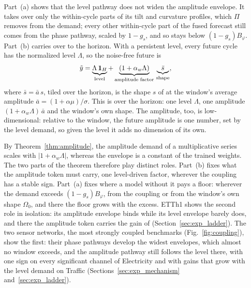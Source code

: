 {Part~(a) shows that the level pathway does not widen the amplitude envelope. It takes over only the within-cycle parts of its tilt and curvature profiles, which $\Pi$ removes from the demand; every other within-cycle part of the fused forecast still comes from the phase pathway, scaled by $1-g_s$, and so stays below $(1-g_s)B_\varphi$. Part~(b) carries  over to the horizon. With a persistent level, every future cycle has the normalized level $\Lambda$, so the noise-free future is
\begin{equation}
\tilde y=\underbrace{\Lambda\,\mathbf 1_H}_{\text{level}}+\underbrace{(1+\alpha_w\Lambda)}_{\text{amplitude factor}}\,\underbrace{\bar s}_{\text{shape}} ,
\label{eq:future_three_parts}
\end{equation}
where $\bar s=\bar a\,s$, tiled over the horizon, is the shape $s$ of  at the window's average amplitude $\bar a=(1+\alpha\mu)/\sigma$. This is  over the horizon: one level $\Lambda$, one amplitude $(1+\alpha_w\Lambda)\,\bar a$ and the window's own shape. The amplitude, too, is low-dimensional: relative to the window, the future amplitude is one number, set by the level demand, so given the level it adds no dimension of its own.

By Theorem~\ref{thm:amplitude}, the amplitude demand of a multiplicative series scales with $|1+\alpha_w\Lambda|$, whereas the envelope is a constant of the trained weights. The two parts of the theorem therefore play distinct roles. Part~(b) fixes what the amplitude token must carry, one level-driven factor, wherever the coupling has a stable sign. Part~(a) fixes where a model without it pays a floor: wherever the demand exceeds $(1-g_s)B_\varphi$, from the coupling or from the window's own shape $\Omega_0$, and there the floor grows with the excess. ETTh1 shows the second role in isolation: its amplitude envelope binds while its level envelope barely does, and there the amplitude token carries the gain of \sysplus (Section~\ref{sec:exp_ladder}). The two sensor networks, the most strongly coupled benchmarks (Fig.~\ref{fig:coupling}), show the first: their phase pathways develop the widest envelopes, which almost no window exceeds, and the amplitude pathway still follows the level there, with one sign on every significant channel of Electricity and with gains that grow with the level demand on Traffic (Sections~\ref{sec:exp_mechanism} and~\ref{sec:exp_ladder}).

}
